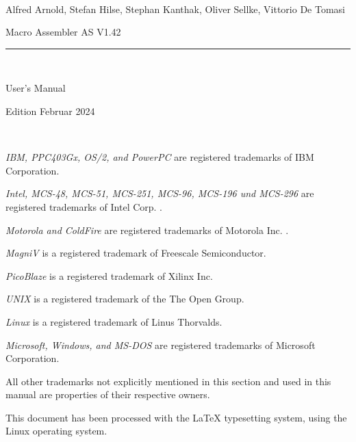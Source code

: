 \documentclass[12pt,twoside]{report}
\newcommand{\asname}{{AS}}
\begin{document}
\thispagestyle{empty}

\
\vspace{7cm}\par

\begin{raggedright}
{\large Alfred Arnold, Stefan Hilse, Stephan Kanthak, Oliver
 Sellke, Vittorio De Tomasi}
\vspace{1cm}\par
{\huge Macro Assembler \asname{} V1.42}\\
\rule{9.5cm}{0.3mm}\\
\vspace{2mm}\par
{\huge User's Manual}

\vspace{1cm}\par

{\large Edition Februar 2024}
\end{raggedright}

\clearpage
\thispagestyle{empty}

\ \vspace{5cm}

{\em IBM, PPC403Gx, OS/2, and PowerPC} are registered trademarks of IBM
Corporation.

{\em Intel, MCS-48, MCS-51, MCS-251, MCS-96, MCS-196 und MCS-296} are
registered trademarks of Intel Corp. .

{\em Motorola and ColdFire} are registered trademarks of Motorola Inc. .

{\em MagniV} is a registered trademark of Freescale Semiconductor.

{\em PicoBlaze} is a registered trademark of Xilinx Inc.

{\em UNIX} is a registered trademark of the The Open Group.

{\em Linux} is a registered trademark of Linus Thorvalds.

{\em Microsoft, Windows, and MS-DOS} are registered trademarks of
Microsoft Corporation.

All other trademarks not explicitly mentioned in this section and used in
this manual are properties of their respective owners.

\vspace{5cm}

This document has been processed with the LaTeX typesetting system, using
the Linux operating system.

\clearpage

\end{document}
